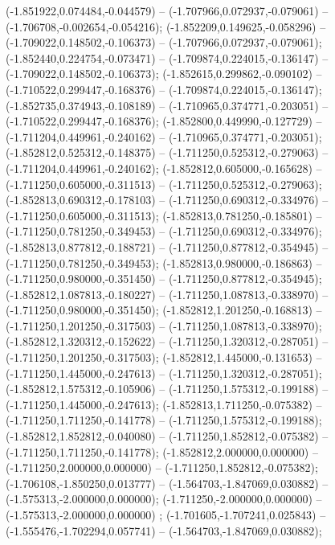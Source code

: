  (-1.851922,0.074484,-0.044579) -- (-1.707966,0.072937,-0.079061) -- (-1.706708,-0.002654,-0.054216);
 (-1.852209,0.149625,-0.058296) -- (-1.709022,0.148502,-0.106373) -- (-1.707966,0.072937,-0.079061);
 (-1.852440,0.224754,-0.073471) -- (-1.709874,0.224015,-0.136147) -- (-1.709022,0.148502,-0.106373);
 (-1.852615,0.299862,-0.090102) -- (-1.710522,0.299447,-0.168376) -- (-1.709874,0.224015,-0.136147);
 (-1.852735,0.374943,-0.108189) -- (-1.710965,0.374771,-0.203051) -- (-1.710522,0.299447,-0.168376);
 (-1.852800,0.449990,-0.127729) -- (-1.711204,0.449961,-0.240162) -- (-1.710965,0.374771,-0.203051);
 (-1.852812,0.525312,-0.148375) -- (-1.711250,0.525312,-0.279063) -- (-1.711204,0.449961,-0.240162);
 (-1.852812,0.605000,-0.165628) -- (-1.711250,0.605000,-0.311513) -- (-1.711250,0.525312,-0.279063);
 (-1.852813,0.690312,-0.178103) -- (-1.711250,0.690312,-0.334976) -- (-1.711250,0.605000,-0.311513);
 (-1.852813,0.781250,-0.185801) -- (-1.711250,0.781250,-0.349453) -- (-1.711250,0.690312,-0.334976);
 (-1.852813,0.877812,-0.188721) -- (-1.711250,0.877812,-0.354945) -- (-1.711250,0.781250,-0.349453);
 (-1.852813,0.980000,-0.186863) -- (-1.711250,0.980000,-0.351450) -- (-1.711250,0.877812,-0.354945);
 (-1.852812,1.087813,-0.180227) -- (-1.711250,1.087813,-0.338970) -- (-1.711250,0.980000,-0.351450);
 (-1.852812,1.201250,-0.168813) -- (-1.711250,1.201250,-0.317503) -- (-1.711250,1.087813,-0.338970);
 (-1.852812,1.320312,-0.152622) -- (-1.711250,1.320312,-0.287051) -- (-1.711250,1.201250,-0.317503);
 (-1.852812,1.445000,-0.131653) -- (-1.711250,1.445000,-0.247613) -- (-1.711250,1.320312,-0.287051);
 (-1.852812,1.575312,-0.105906) -- (-1.711250,1.575312,-0.199188) -- (-1.711250,1.445000,-0.247613);
 (-1.852813,1.711250,-0.075382) -- (-1.711250,1.711250,-0.141778) -- (-1.711250,1.575312,-0.199188);
 (-1.852812,1.852812,-0.040080) -- (-1.711250,1.852812,-0.075382) -- (-1.711250,1.711250,-0.141778);
 (-1.852812,2.000000,0.000000) -- (-1.711250,2.000000,0.000000) -- (-1.711250,1.852812,-0.075382);
 (-1.706108,-1.850250,0.013777) -- (-1.564703,-1.847069,0.030882) -- (-1.575313,-2.000000,0.000000);
 (-1.711250,-2.000000,0.000000) -- (-1.575313,-2.000000,0.000000) ;
 (-1.701605,-1.707241,0.025843) -- (-1.555476,-1.702294,0.057741) -- (-1.564703,-1.847069,0.030882);
